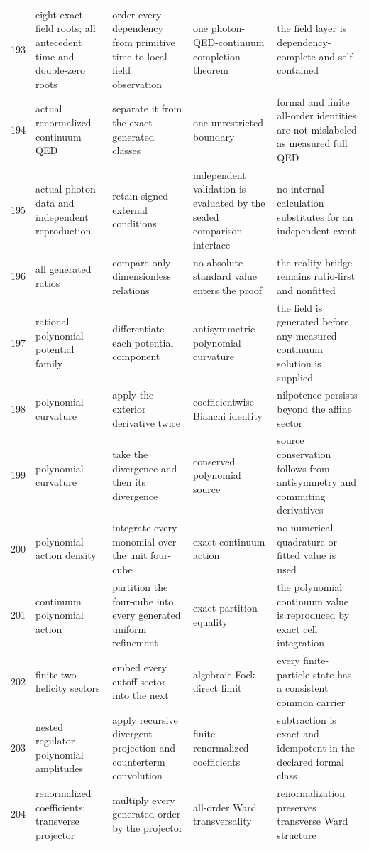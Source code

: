 \documentclass[11pt]{article}
\numberwithin{equation}{section}
\theoremstyle{remark}
\begin{document}
\begin{landscape}
\begin{longtable}{p{0.65cm}p{3.5cm}p{4.0cm}p{4.0cm}p{4.6cm}}
193&eight exact field roots; all antecedent time and double-zero roots&order every dependency from primitive time to local field observation&one photon-QED-continuum completion theorem&the field layer is dependency-complete and self-contained\\
194&actual renormalized continuum QED&separate it from the exact generated classes&one unrestricted boundary&formal and finite all-order identities are not mislabeled as measured full QED\\
195&actual photon data and independent reproduction&retain signed external conditions&independent validation is evaluated by the sealed comparison interface&no internal calculation substitutes for an independent event\\
196&all generated ratios&compare only dimensionless relations&no absolute standard value enters the proof&the reality bridge remains ratio-first and nonfitted\\
197&rational polynomial potential family&differentiate each potential component&antisymmetric polynomial curvature&the field is generated before any measured continuum solution is supplied\\
198&polynomial curvature&apply the exterior derivative twice&coefficientwise Bianchi identity&nilpotence persists beyond the affine sector\\
199&polynomial curvature&take the divergence and then its divergence&conserved polynomial source&source conservation follows from antisymmetry and commuting derivatives\\
200&polynomial action density&integrate every monomial over the unit four-cube&exact continuum action&no numerical quadrature or fitted value is used\\
201&continuum polynomial action&partition the four-cube into every generated uniform refinement&exact partition equality&the polynomial continuum value is reproduced by exact cell integration\\
202&finite two-helicity sectors&embed every cutoff sector into the next&algebraic Fock direct limit&every finite-particle state has a consistent common carrier\\
203&nested regulator-polynomial amplitudes&apply recursive divergent projection and counterterm convolution&finite renormalized coefficients&subtraction is exact and idempotent in the declared formal class\\
204&renormalized coefficients; transverse projector&multiply every generated order by the projector&all-order Ward transversality&renormalization preserves transverse Ward structure\\
\bottomrule\end{longtable}

\end{landscape}
\end{document}
